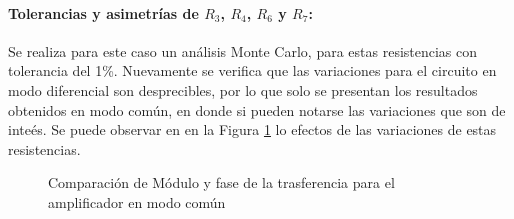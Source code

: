 \paragraph{Tolerancias y asimetr\'ias de $R_3$, $R_4$, $R_6$ y $R_7$:}
Se realiza para este caso un an\'alisis Monte Carlo, para estas resistencias con tolerancia del 1\%. Nuevamente se verifica que las variaciones para el circuito en modo diferencial son desprecibles, por lo que solo se presentan los resultados obtenidos en modo com\'un, en donde si pueden notarse las variaciones que son de inte\'es.
Se puede observar en en la Figura \ref{fig:MC_entrada} lo efectos de las variaciones de estas resistencias.
\begin{figure}[H]
    \centering
{}
\caption{Comparaci\'on de M\'odulo y fase de la trasferencia para el amplificador en modo com\'un}
\label{fig:MC_entrada}
\end{figure}
